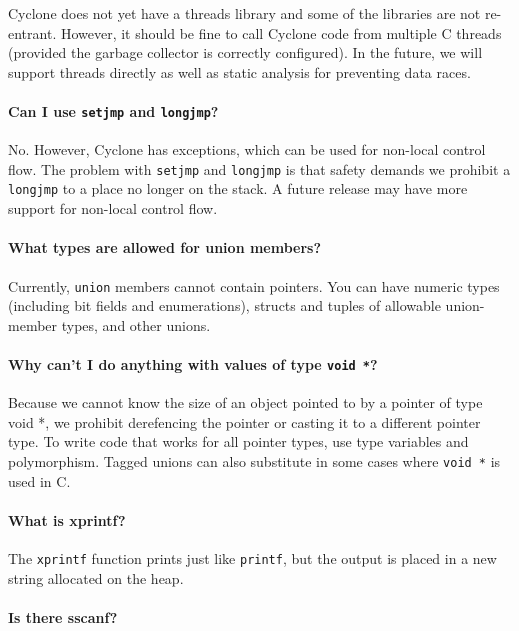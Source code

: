 Cyclone does not yet have a threads library and some of the libraries
are not re-entrant.  However, it should be fine to call Cyclone code
from multiple C threads (provided the garbage collector is correctly
configured).  In the future, we will support threads directly as well
as static analysis for preventing data races.

\paragraph{Can I use \texttt{setjmp} and \texttt{longjmp}?}

No.  However, Cyclone has exceptions, which can be used for non-local
control flow.  The problem with \texttt{setjmp} and \texttt{longjmp}
is that safety demands we prohibit a \texttt{longjmp} to a place no
longer on the stack.  A future release may have more support for
non-local control flow.

\paragraph{What types are allowed for union members?}

Currently, \texttt{union} members cannot contain pointers.  You can
have numeric types (including bit fields and enumerations), structs
and tuples of allowable union-member types, and other unions.

\paragraph{Why can't I do anything with values of type \texttt{void *}?}

Because we cannot know the size of an object pointed to by a pointer
of type void *, we prohibit derefencing the pointer or casting it to a
different pointer type.  To write code that works for all pointer
types, use type variables and polymorphism.  Tagged unions can also
substitute in some cases where \texttt{void *} is used in C\@.

\paragraph{What is xprintf?}

The \texttt{xprintf} function prints just like \texttt{printf}, but
the output is placed in a new string allocated on the heap.

\paragraph{Is there sscanf?}

